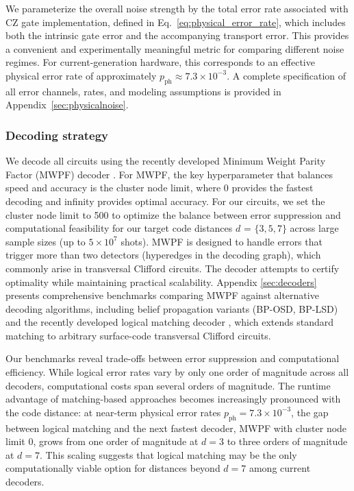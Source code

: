\documentclass[aps, prx, reprint, superscriptaddress, longbibliography, floatfix]{revtex4-2}
\begin{document}
We parameterize the overall noise strength by the total error rate associated with CZ gate implementation, defined in Eq.~\eqref{eq:physical_error_rate}, which includes both the intrinsic gate error and the accompanying transport error. This provides a convenient and experimentally meaningful metric for comparing different noise regimes. For current-generation hardware, this corresponds to an effective physical error rate of approximately $p_{\mathrm{ph}} \approx 7.3 \times 10^{-3}$. A complete specification of all error channels, rates, and modeling assumptions is provided in Appendix~\ref{sec:physicalnoise}.


\subsubsection{Decoding strategy}

We decode all circuits using the recently developed Minimum Weight Parity Factor (MWPF) decoder \cite{wu2025mwpf}. For MWPF, the key hyperparameter that balances speed and accuracy is the cluster node limit, where 0 provides the fastest decoding and infinity provides optimal accuracy. For our circuits, we set the cluster node limit to 500 to optimize the balance between error suppression and computational feasibility for our target code distances $d$ = $ \{ 3, 5, 7\}$ across large sample sizes (up to $5 \times 10^7$ shots). MWPF is designed to handle errors that trigger more than two detectors (hyperedges in the decoding graph), which commonly arise in transversal Clifford circuits. The decoder attempts to certify optimality while maintaining practical scalability. Appendix \ref{sec:decoders} presents comprehensive benchmarks comparing MWPF against alternative decoding algorithms, including belief propagation variants (BP-OSD, BP-LSD) \cite{Roffe_2020, Roffe_LDPC_tools, delfosse2021} and the recently developed logical matching decoder \cite{Cain2025b, serraperalta2025}, which extends standard matching to arbitrary surface-code transversal Clifford circuits. 

Our benchmarks reveal trade-offs between error suppression and computational efficiency. While logical error rates vary by only one order of magnitude across all decoders, computational costs span several orders of magnitude. The runtime advantage of matching-based approaches becomes increasingly pronounced with the code distance: at near-term physical error rates $p_{\mathrm{ph}} = 7.3 \times 10^{-3}$, the gap between logical matching and the next fastest decoder, MWPF with cluster node limit 0, grows from one order of magnitude at $d=3$ to three orders of magnitude at $d=7$. This scaling suggests that logical matching may be the only computationally viable option for distances beyond $d=7$ among current decoders.
\end{document}
